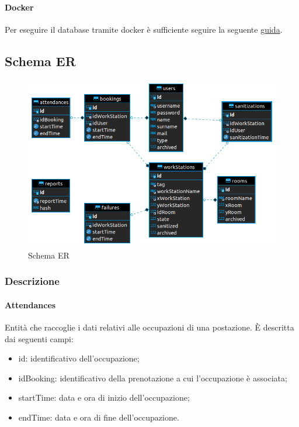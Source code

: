 \paragraph{Docker}
Per eseguire il database tramite docker è sufficiente seguire la seguente \href{https://hub.docker.com/\_/mariadb}{guida}.

\subsection{Schema ER}
\begin{figure}[H]
	\centering
	\includegraphics[width=16cm]{res/images/schemaER.png}
	\caption{Schema ER}
	\label{fig:schema ER}
\end{figure}

\subsubsection{Descrizione}
\paragraph{Attendances}
Entità che raccoglie i dati relativi alle occupazioni di una postazione. È descritta dai seguenti campi:
\begin{itemize}
	\item id: identificativo dell'occupazione;
	\item idBooking: identificativo della prenotazione a cui l'occupazione è associata;
	\item startTime: data e ora di inizio dell'occupazione;
	\item endTime: data e ora di fine dell'occupazione.
\end{itemize}

